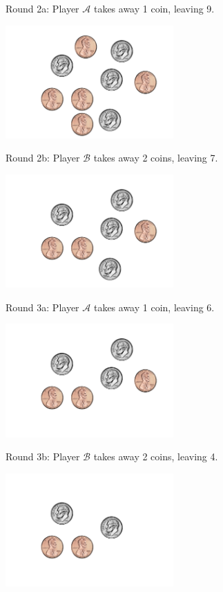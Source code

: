 \documentclass{beamer}
\theoremstyle{theorem}
\theoremstyle{definition}
\newcommand{\<}{\langle}
\renewcommand{\>}{\rangle}
\newcommand{\pl}[1]{\mathscr{#1}}
\begin{document}
\begin{frame}
  Round 2a: Player $\pl A$ takes away 1 coin, leaving 9.

  \centerline{
    \includegraphics[height=1.7in]{takeawayCoins/09.pdf}
  }
\end{frame}

\begin{frame}
  Round 2b: Player $\pl B$ takes away 2 coins, leaving 7.

  \centerline{
    \includegraphics[height=1.7in]{takeawayCoins/07.pdf}
  }
\end{frame}

\begin{frame}
  Round 3a: Player $\pl A$ takes away 1 coin, leaving 6.

  \centerline{
    \includegraphics[height=1.7in]{takeawayCoins/06.pdf}
  }
\end{frame}

\begin{frame}
  Round 3b: Player $\pl B$ takes away 2 coins, leaving 4.

  \centerline{
    \includegraphics[height=1.7in]{takeawayCoins/04.pdf}
  }
\end{frame}
\end{document}
